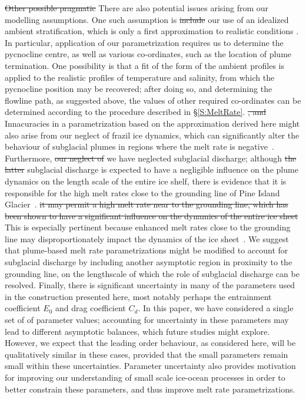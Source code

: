 \documentclass[openacc]{rsproca_new}%
\newcommand{\red}[1]{{\color{red} #1}}
\newcommand{\blue}[1]{{\color{blue} #1}}
\newcommand{\rout}[1]{\red{\st{#1}}}\newcommand{\ab}[1]{\textcolor{Green}{#1}}\newcommand{\about}[1]{\textcolor{Cyan}{\sout{#1}}}
\begin{document}
\rout{Other possible pragmatic} \blue{There are also potential} issues \blue{arising from our modelling assumptions. One such assumption is}\rout{include} our use of an idealized ambient stratification, which is only a first approximation to realistic conditions\blue{. In particular, application of our parametrization requires us to determine the pycnocline centre, as well as various co-ordinates, such as the location of plume termination. One possibility is that a fit of the form of the ambient profiles is applied to the realistic profiles of temperature and salinity, from which the pycnocline position may be recovered; after doing so, and determining the flowline path, as suggested above, the values of other required co-ordinates can be determined according to the procedure described in \S\ref{S:MeltRate}.} \rout{, and} \blue{Innacuracies in a parametrization based on the approximation derived here might also arise from our neglect of frazil ice dynamics, which can significantly alter the behaviour of subglacial plumes in regions where the melt rate is negative~\cite{ReesJones2018Cryo}. Furthermore, }\rout{our neglect of}\blue{we have neglected} subglacial discharge; although \rout{the latter}\blue{subglacial discharge} is expected to have a negligible influence on the plume dynamics \blue{on the length scale of the entire ice shelf}, \blue{there is evidence that it is responsible for the high melt rates close to the grounding line of Pine Island Glacier~\cite{Nakayama2021GRL}. } \rout{it may permit a high melt rate near to the grounding line, which has been shown to have a significant influence on the dynamics of the entire ice sheet}\blue{This is especially pertinent because enhanced melt rates close to the grounding line may disproportionately impact the dynamics of the ice sheet~\cite{Arthern2017GRL,Seroussi2018Cryo}. We suggest that plume-based melt rate parametrizations might be modified to account for subglacial discharge by including another asymptotic region in proximity to the grounding line, on the lengthscale of which the role of subglacial discharge can be resolved.} \blue{Finally, there is significant uncertainty in many of the parameters used in the construction presented here, most notably perhaps the entrainment coefficient $E_0$ and drag coefficient $C_d$. In this paper, we have considered a single set of of parameter values; accounting for uncertainty in these parameters may lead to different asymptotic balances, which future studies might explore. However, we expect that the leading order behaviour, as considered here, will be qualitatively similar in these cases, provided that the small parameters remain small within these uncertainties. Parameter uncertainty also provides motivation for improving our understanding of small scale ice-ocean processes in order to better constrain these parameters, and thus improve melt rate parametrizations.}
\end{document}
